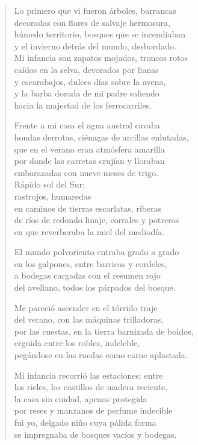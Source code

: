 \documentclass[12pt]{article}
\begin{document}
\clearpage
{}
\begin{verse}

Lo primero que vi fueron árboles, barrancas\\
decoradas con flores de salvaje hermosura,\\
húmedo territorio, bosques que se incendiaban\\
y el invierno detrás del mundo, desbordado.\\
Mi infancia son zapatos mojados, troncos rotos\\
caídos en la selva, devorados por lianas\\
y escarabajos, dulces días sobre la avena,\\
y la barba dorada de mi padre saliendo\\
hacia la majestad de los ferrocarriles.  

Frente a mi casa el agua austral cavaba\\
hondas derrotas, ciénagas de arcillas enlutadas,\\
que en el verano eran atmósfera amarilla\\
por donde las carretas crujían y lloraban\\
embarazadas con nueve meses de trigo.\\
Rápido sol del Sur:\\
rastrojos, humaredas\\
en caminos de tierras escarlatas, riberas\\
de ríos de redondo linaje, corrales y potreros\\
en que reverberaba la miel del mediodía.  

El mundo polvoriento entraba grado a grado\\
en los galpones, entre barricas y cordeles,\\
a bodegas cargadas con el resumen rojo\\
del avellano, todos los párpados del bosque.  

Me pareció ascender en el tórrido traje\\
del verano, con las máquinas trilladoras,\\
por las cuestas, en la tierra barnizada de boldos,\\
erguida entre los robles, indeleble,\\
pegándose en las ruedas como carne aplastada.  

Mi infancia recorrió las estaciones: entre\\
los rieles, los castillos de madera reciente,\\
la casa sin ciudad, apenas protegida\\
por reses y manzanos de perfume indecible\\
fui yo, delgado niño cuya pálida forma\\
se impregnaba de bosques vacíos y bodegas.  

\end{verse}
\end{document}
